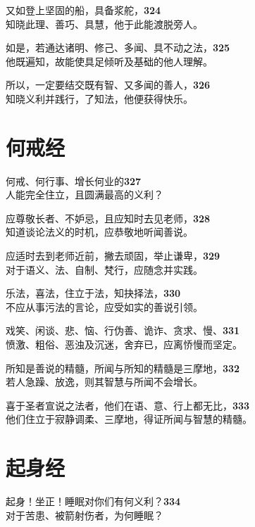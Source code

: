 又如登上坚固的船，具备浆舵，\hfill{\grayfootnotesize \textbf{324}} \\
知晓此理、善巧、具慧，他于此能渡脱旁人。


如是，若通达诸明、修己、多闻、具不动之法，\hfill{\grayfootnotesize \textbf{325}} \\
他既遍知，故能使具足倾听及基础的他人理解。


所以，一定要结交既有智、又多闻的善人，\hfill{\grayfootnotesize \textbf{326}} \\
知晓义利并践行，了知法，他便获得快乐。


\section{何戒经}

何戒、何行事、增长何业的\hfill{\grayfootnotesize \textbf{327}} \\
人能完全住立，且圆满最高的义利？


应尊敬长者、不妒忌，且应知时去见老师，\hfill{\grayfootnotesize \textbf{328}} \\
知道谈论法义的时机，应恭敬地听闻善说。


应适时去到老师近前，撇去顽固，举止谦卑，\hfill{\grayfootnotesize \textbf{329}} \\
对于语义、法、自制、梵行，应随念并实践。


乐法，喜法，住立于法，知抉择法，\hfill{\grayfootnotesize \textbf{330}} \\
不应从事污法的言论，应受如实的善说引领。


戏笑、闲谈、悲、恼、行伪善、诡诈、贪求、慢、\hfill{\grayfootnotesize \textbf{331}} \\
愤激、粗俗、恶浊及沉迷，舍弃已，应离㤭慢而坚定。


所知是善说的精髓，所闻与所知的精髓是三摩地，\hfill{\grayfootnotesize \textbf{332}} \\
若人急躁、放逸，则其智慧与所闻不会增长。


喜于圣者宣说之法者，他们在语、意、行上都无比，\hfill{\grayfootnotesize \textbf{333}} \\
他们住立于寂静调柔、三摩地，得证所闻与智慧的精髓。


\section{起身经}


起身！坐正！睡眠对你们有何义利？\hfill{\grayfootnotesize \textbf{334}} \\
对于苦患、被箭射伤者，为何睡眠？


